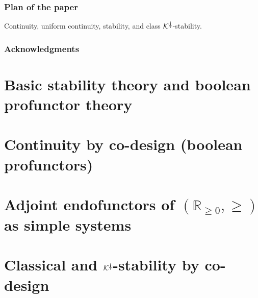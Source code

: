 \documentclass[11pt, one side, article]{memoir}
\theoremstyle{definition}
\theoremstyle{plain}
\newcommand{\cat}[1]{\mathcal{#1}}%
\newcommand{\rr}{\mathbb{R}}
\newcommand{\rrnon}{\rr_{\geq 0}}
\newcommand{\K}{\cat{K}}
\newcommand{\Kdag}[1][0]{\K^{\rotatebox{180}{$\dagger$}}}
\begin{document}
\subsection{Plan of the paper}

Continuity, 
uniform continuity, 
stability, and
class $\Kdag$-stability.

\subsection*{Acknowledgments}



\chapter{Basic stability theory and boolean profunctor theory}
\label{chap.stability_and_profunctors}

\chapter{Continuity by co-design (boolean profunctors)}
\label{}

\chapter{Adjoint endofunctors of $(\rrnon,\geq)$ as simple systems}
\label{}

\chapter{Classical and $\Kdag$-stability by co-design}
\label{}
\end{document}
